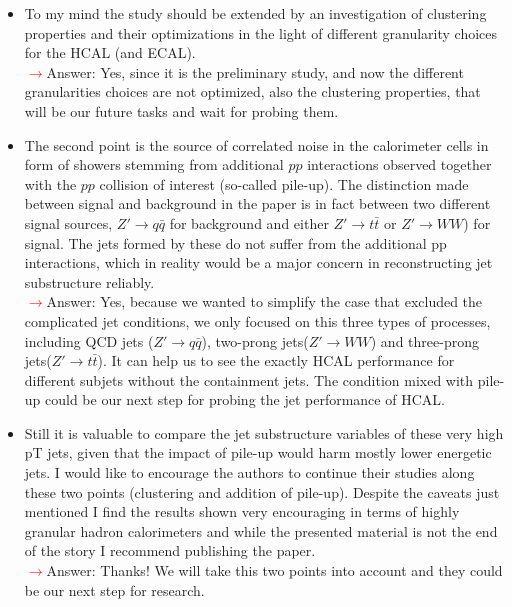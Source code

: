 \documentclass[final,1p,11pt]{elsarticle}
\begin{document}
\begin{itemize}
\item To my mind the study should be extended by an investigation of clustering properties and their optimizations in the light of different granularity choices for the HCAL (and ECAL).\\
 \textcolor{red}{$\rightarrow$}Answer: Yes, since it is the preliminary study, and now the different granularities choices are not optimized, also the clustering properties, that will be our future tasks and wait for probing them.\\
\item The second point is the source of correlated noise in the calorimeter cells in form of showers stemming from additional $pp$ interactions observed together with the $pp$ collision of interest (so-called pile-up). The distinction made between signal and background in the paper is in fact between two different signal sources, $Z'\rightarrow q\bar{q}$ for background and either $Z' \rightarrow t\bar{t}$ or $Z' \rightarrow WW$) for signal. The jets formed by these do not suffer from the additional pp interactions, which in reality would be a major concern in reconstructing jet substructure reliably.\\
 \textcolor{red}{$\rightarrow$}Answer: Yes, because we wanted to simplify the case that excluded the complicated jet conditions, we only focused on this three types of processes, including QCD jets ($Z'\rightarrow q\bar{q}$), two-prong jets($Z' \rightarrow WW$) and three-prong jets($Z' \rightarrow t\bar{t}$). It can help us to see the exactly HCAL performance for different subjets without the containment jets. The condition mixed with pile-up could be our next step for probing the jet performance of HCAL.
\item Still it is valuable to compare the jet substructure variables of these very high pT jets, given that the impact of pile-up would harm mostly lower energetic jets. I would like to encourage the authors to continue their studies along these two points (clustering and addition of pile-up). Despite the caveats just mentioned I find the results shown very encouraging in terms of highly granular hadron calorimeters and while the presented material is not the end of the story I recommend publishing the paper.\\
 \textcolor{red}{$\rightarrow$}Answer: Thanks! We will take this two points into account and they could be our next step for research. 
\end{itemize}
\end{document}
